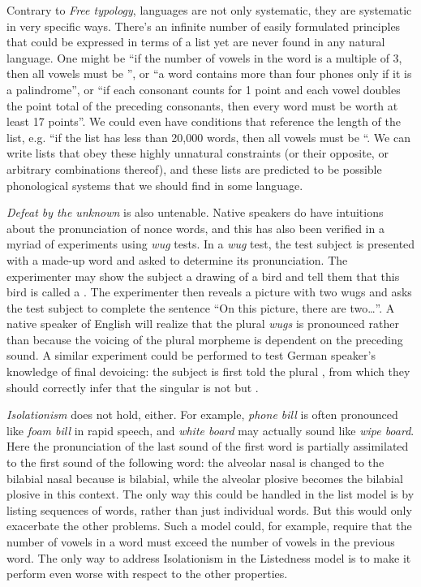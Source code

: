 Contrary to \emph{Free typology}, languages are not only systematic, they are systematic in very specific ways.
There's an infinite number of easily formulated principles that could be expressed in terms of a list yet are never found in any natural language.
One might be
``if the number of vowels in the word is a multiple of $3$, then all vowels must be '',
or
``a word contains more than four phones only if it is a palindrome'', or
``if each consonant counts for 1 point and each vowel doubles the point total of the preceding consonants, then every word must be worth at least 17 points''.
We could even have conditions that reference the length of the list, e.g.
``if the list has less than 20,000 words, then all vowels must be ``.
We can write lists that obey these highly unnatural constraints (or their opposite, or arbitrary combinations thereof), and these lists are predicted to be possible phonological systems that we should find in some language.

\emph{Defeat by the unknown} is also untenable.
Native speakers do have intuitions about the pronunciation of nonce words, and this has also been verified in a myriad of experiments using \emph{wug} tests.
In a \emph{wug} test, the test subject is presented with a made-up word and asked to determine its pronunciation.
The experimenter may show the subject a drawing of a bird and tell them that this bird is called a \textipa{[w2g]}.
The experimenter then reveals a picture with two wugs and asks the test subject to complete the sentence ``On this picture, there are two\ldots''.
A native speaker of English will realize that the plural \emph{wugs} is pronounced \textipa{[w2gz]} rather than \textipa{[w2gs]} because the voicing of the plural morpheme is dependent on the preceding sound.
A similar experiment could be performed to test German speaker's knowledge of final devoicing: the subject is first told the plural \textipa{[vag@]}, from which they should correctly infer that the singular is not \textipa{[vag]} but \textipa{[vak]}. 

\emph{Isolationism} does not hold, either.
For example, \emph{phone bill} is often pronounced like \emph{foam bill} in rapid speech, and \emph{white board} may actually sound like \emph{wipe board}.
Here the pronunciation of the last sound of the first word is partially assimilated to the first sound of the following word: the alveolar nasal \textipa{[n]} is changed to the bilabial nasal \textipa{[m]} because \textipa{[b]} is bilabial, while the alveolar plosive \textipa{[t]} becomes the bilabial plosive \textipa{[p]} in this context.
The only way this could be handled in the list model is by listing sequences of words, rather than just individual words.
But this would only exacerbate the other problems.
Such a model could, for example, require that the number of vowels in a word must exceed the number of vowels in the previous word.
The only way to address Isolationism in the Listedness model is to make it perform even worse with respect to the other properties.


